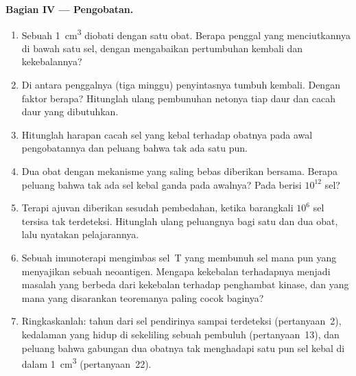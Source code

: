 \begin{problem}
\medskip
\noindent\textbf{Bagian IV --- Pengobatan.}
\begin{enumerate}[resume]
  \item Sebuah  \qty{1}{cm^3} diobati dengan satu obat. Berapa
        penggal yang menciutkannya di bawah satu sel, dengan mengabaikan
        pertumbuhan kembali dan kekebalannya?
  \item Di antara penggalnya (tiga minggu) penyintasnya tumbuh kembali. Dengan
        faktor berapa? Hitunglah ulang pembunuhan netonya tiap daur dan cacah
        daur yang dibutuhkan.
  \item Hitunglah harapan cacah sel yang kebal terhadap obatnya pada
        awal pengobatannya dan peluang bahwa tak ada satu pun.
  \item Dua obat dengan mekanisme yang saling bebas diberikan bersama.
        Berapa peluang bahwa tak ada sel kebal ganda pada awalnya?
        Pada  berisi $10^{12}$ sel?
  \item Terapi ajuvan diberikan sesudah pembedahan, ketika barangkali $10^{6}$
        sel tersisa tak terdeteksi. Hitunglah ulang peluangnya bagi satu
        dan dua obat, lalu nyatakan pelajarannya.
  \item Sebuah imunoterapi mengimbas sel~T yang membunuh sel mana pun yang
        menyajikan sebuah neoantigen. Mengapa kekebalan terhadapnya menjadi
        masalah yang berbeda dari kekebalan terhadap penghambat kinase, dan
         yang mana yang disarankan teoremanya paling cocok baginya?
  \item Ringkaskanlah: tahun dari sel pendirinya sampai terdeteksi
        (pertanyaan~2), kedalaman  yang hidup di sekeliling sebuah
        pembuluh (pertanyaan~13), dan peluang bahwa gabungan dua obatnya
        tak menghadapi satu pun sel kebal di dalam  \qty{1}{cm^3}
        (pertanyaan~22).
\end{enumerate}
\end{problem}
